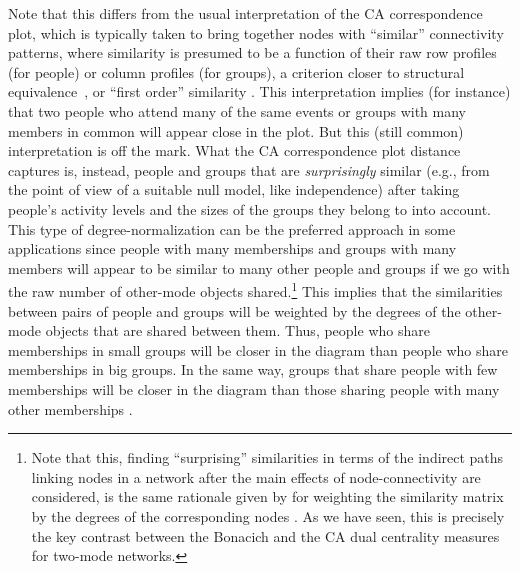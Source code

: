 \documentclass[a4paper,fleqn]{cas-sc}
\begin{document}
Note that this differs from the usual interpretation of the CA correspondence plot, which is typically taken to bring together nodes with ``similar'' connectivity patterns, where similarity is presumed to be a function of their raw row profiles (for people) or column profiles (for groups), a criterion closer to structural equivalence~\citep{desposito2014comparison}, or ``first order'' similarity \citep{kovacs2010generalized}. This interpretation implies (for instance) that two people who attend many of the same events or groups with many members in common will appear close in the plot. But this (still common) interpretation is off the mark. What the CA correspondence plot distance captures is, instead, people and groups that are \textit{surprisingly} similar (e.g., from the point of view of a suitable null model, like independence) after taking people's activity levels and the sizes of the groups they belong to into account. This type of degree-normalization can be the preferred approach in some applications since people with many memberships and groups with many members will appear to be similar to many other people and groups if we go with the raw number of other-mode objects shared.\footnote{Note that this, finding ``surprising'' similarities in terms of the indirect paths linking nodes in a network after the main effects of node-connectivity are considered, is the same rationale given by \cite{leicht2006vertex} for weighting the \citet{katz1953new} similarity matrix by the degrees of the corresponding nodes \citep[see][68, eqs. 2.13 and 2.14]{fouss2016algorithms}. As we have seen, this is precisely the key contrast between the Bonacich and the CA dual centrality measures for two-mode networks.} This implies that the similarities between pairs of people and groups will be weighted by the degrees of the other-mode objects that are shared between them. Thus, people who share memberships in small groups will be closer in the diagram than people who share memberships in big groups. In the same way, groups that share people with few memberships will be closer in the diagram than those sharing people with many other memberships \citep{desposito2014comparison}. 
\end{document}
